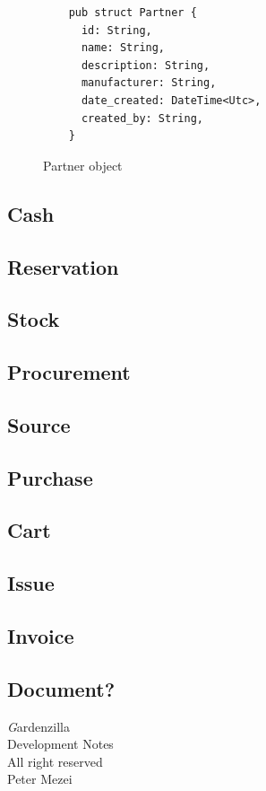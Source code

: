 \documentclass{article}
\begin{document}
\begin{figure}[!htb]
  \caption{Partner object}
  \begin{verbatim}
    pub struct Partner {
      id: String,
      name: String,
      description: String,
      manufacturer: String,
      date_created: DateTime<Utc>,
      created_by: String,
    }
  \end{verbatim}
\end{figure}

\subsection{Cash}

\subsection{Reservation}

\subsection{Stock}

\subsection{Procurement}

\subsection{Source}

\subsection{Purchase}

\subsection{Cart}

\subsection{Issue}

\subsection{Invoice}

\subsection{Document?}


\newpage
\todototoc
\listoftodos

\newpage
\thispagestyle{empty}
\vspace*{5cm}
\begin{center}
  {\textit Gardenzilla\\ Development Notes \\ \vspace{5mm}
    All right reserved \\ Peter Mezei \\\the\year{}}
\end{center}
\end{document}
